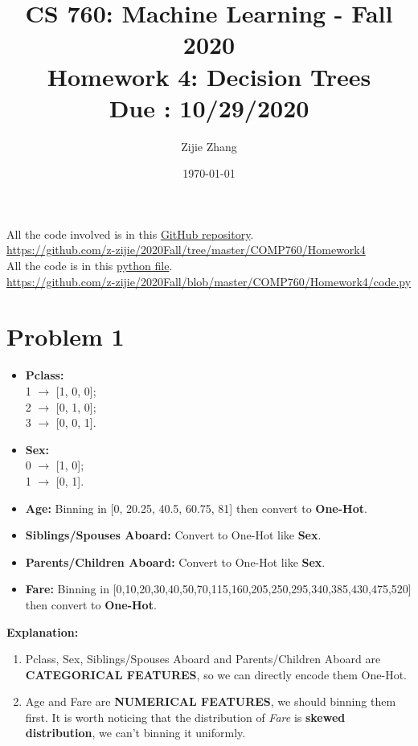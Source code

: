 \documentclass{article}
\title{CS 760: Machine Learning - Fall 2020\\
        {\Large \textbf{Homework 4: Decision Trees}}\\
        {\normalsize \textbf{Due : 10/29/2020}}
    }
\author{Zijie Zhang}
\date{\today}
\begin{document}
    \maketitle
    
\begin{center}
    \Large
    All the code involved is in this \href{https://github.com/z-zijie/2020Fall/tree/master/COMP760/Homework4}{GitHub repository}.\\
    \url{https://github.com/z-zijie/2020Fall/tree/master/COMP760/Homework4}\\
    All the code is in this \href{https://github.com/z-zijie/2020Fall/blob/master/COMP760/Homework4/code.py}{python file}.\\
    \large
    \url{https://github.com/z-zijie/2020Fall/blob/master/COMP760/Homework4/code.py}
\end{center}
\large
\section*{Problem 1}
    \begin{itemize}
        \item \textbf{Pclass:}\\
        1 $\to$ [1, 0, 0];\\
        2 $\to$ [0, 1, 0];\\
        3 $\to$ [0, 0, 1].
        \item \textbf{Sex:}\\
        0 $\to$ [1, 0];\\
        1 $\to$ [0, 1].
        \item \textbf{Age:} Binning in [0, 20.25, 40.5, 60.75, 81] then convert to \textbf{One-Hot}.
        \item \textbf{Siblings/Spouses Aboard:} Convert to One-Hot like \textbf{Sex}.
        \item \textbf{Parents/Children Aboard:} Convert to One-Hot like \textbf{Sex}.
        \item \textbf{Fare:} Binning in [0,10,20,30,40,50,70,115,160,205,250,295,340,385,430,475,520] then convert to \textbf{One-Hot}.
    \end{itemize}
    \textbf{Explanation:}
    \begin{enumerate}
        \item Pclass, Sex, Siblings/Spouses Aboard and Parents/Children Aboard are \textbf{CATEGORICAL FEATURES}, so we can directly encode them One-Hot.
        \item Age and Fare are \textbf{NUMERICAL FEATURES}, we should binning them first. It is worth noticing that the distribution of \textit{Fare} is \textbf{skewed distribution}, we can't binning it uniformly.
    \end{enumerate}
\pagebreak
\end{document}
